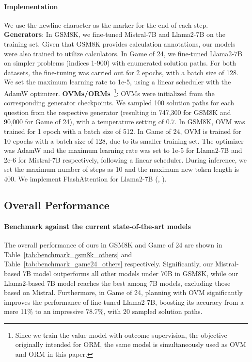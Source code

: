 \documentclass[11pt]{article}
\theoremstyle{plain}
\theoremstyle{claim}
\theoremstyle{rethinking}
\theoremstyle{researchquestion}
\theoremstyle{findings}
\theoremstyle{fact}
\theoremstyle{proper}
\theoremstyle{remark}
\begin{document}
\paragraph{Implementation} We use the newline character as the marker for the end of each step. \textbf{Generators}: In GSM8K, we fine-tuned Mistral-7B and Llama2-7B on the training set. Given that GSM8K provides calculation annotations, our models were also trained to utilize calculators. In Game of 24, we fine-tuned Llama2-7B on simpler problems (indices 1-900) with enumerated solution paths. For both datasets, the fine-tuning was carried out for 2 epochs, with a batch size of 128. We set the maximum learning rate to 1e-5, using a linear scheduler with the AdamW optimizer. \textbf{OVMs/ORMs}~\footnote{Since we train the value model with outcome supervision, the objective originally intended for ORM, the same model is simultaneously used as OVM and ORM in this paper.}: OVMs were initialized from the corresponding generator checkpoints. We sampled 100 solution paths for each question from the respective generator (resulting in 747,300 for GSM8K and 90,000 for Game of 24), with a temperature setting of 0.7. In GSM8K, OVM was trained for 1 epoch with a batch size of 512. In Game of 24, OVM is trained for 10 epochs with a batch size of 128, due to its smaller training set. The optimizer was AdamW and the maximum learning rate was set to 1e-5 for Llama2-7B and 2e-6 for Mistral-7B respectively, following a linear scheduler. During inference, we set the maximum number of steps as 10 and the maximum new token length is 400. We implement FlashAttention for Llama2-7B (\citealp{flashattention22}, \citealp{flashattention23}).


\subsection{Overall Performance}

\paragraph{Benchmark against the current state-of-the-art models} 
The overall performance of ours in GSM8K and Game of 24 are shown in Table~\ref{tab:benchmark_gsm8k_others} and Table~\ref{tab:benchmark_game24_others} respectively. 
Significantly, our Mistral-based 7B model outperforms all other models under 70B in GSM8K, while our Llama2-based 7B model reaches the best among 7B models, excluding those based on Mistral. Furthermore, in Game of 24, planning with OVM significantly improves the performance of fine-tuned Llama2-7B, boosting its accuracy from a mere 11\% to an impressive 78.7\%, with 20 sampled solution paths.
\end{document}

